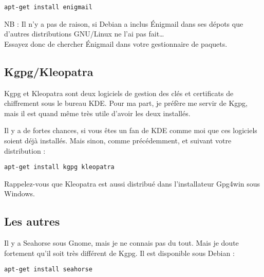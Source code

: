 \begin{lstlisting}
apt-get install enigmail
\end{lstlisting}

\begin{notice}NB : Il n'y a pas de raison, si Debian a inclus Énigmail dans ses
dépots que d'autres distributions GNU/Linux ne l'ai pas
fait\ldots{}\\Essayez donc de chercher Énigmail dans votre gestionnaire
de paquets.
\end{notice}

\subsection{Kgpg/Kleopatra}\label{kgpgkleopatra}

Kgpg et Kleopatra sont deux logiciels de gestion des clés et certificats
de chiffrement sous le bureau KDE. Pour ma part, je préfère me servir de
Kgpg, mais il est quand même très utile d'avoir les deux installés.

Il y a de fortes chances, si vous êtes un fan de KDE comme moi que ces
logiciels soient déjà installés. Mais sinon, comme précédemment, et
suivant votre distribution :

\begin{lstlisting}
apt-get install kgpg kleopatra
\end{lstlisting}

Rappelez-vous que Kleopatra est aussi distribué dans l'installateur
Gpg4win sous Windows.

\subsection{Les autres}\label{les-autres-1}

Il y a Seahorse sous Gnome, mais je ne connais pas du tout. Mais je
doute fortement qu'il soit très différent de Kgpg. Il est disponible
sous Debian :

\begin{lstlisting}
apt-get install seahorse
\end{lstlisting}
